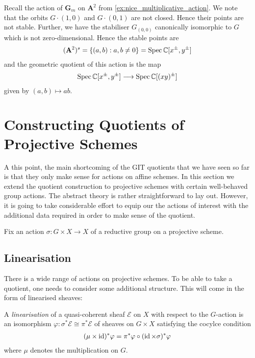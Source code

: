 \documentclass[12pt]{ociamthesis}  %
\begin{document}
\begin{example}
  Recall the action of $\mathbf G_m$ on $\mathbf A^2$ from
  \ref{ex:nice_multiplicative_action}. We note that the orbits
  $G\cdot(1,0)$ and $G\cdot(0,1)$ are not closed. Hence their points
  are not stable. Further, we have the stabiliser $G_{(0,0)}$
  canonically isomorphic to $G$ which is not zero-dimensional.
  Hence the stable points are
  \begin{align*}
    (\mathbf A^2)^s = \{(a,b):a,b\neq 0\} = \operatorname{Spec} \mathbb C[x^\pm,y^\pm]
  \end{align*}
  and the geometric quotient of this action is the map
  \begin{align*}
    \operatorname{Spec}\mathbb C[x^\pm,y^\pm]\longrightarrow\operatorname{Spec}\mathbb C[(xy)^\pm]
  \end{align*}
  given by $(a,b)\mapsto ab$.
\end{example}

\section{Constructing Quotients of Projective Schemes}

A this point, the main shortcoming of the GIT quotients that
we have seen so far is that they only make sense for actions on
affine schemes. In this section we extend the quotient construction
to projective schemes with certain well-behaved group actions.
The abstract theory is rather straightforward to lay out. However,
it is going to take considerable effort to equip our the actions of interest
with the additional data required in order to make sense of the quotient.

Fix an action $\sigma : G\times X\to X$ of a reductive
group on a projective scheme.

\subsection{Linearisation}

There is a wide range of actions on projective schemes. To be able to
take a quotient, one needs to consider some additional structure. This
will come in the form of linearised sheaves:

\begin{definition}
  A \emph{linearisation} of a quasi-coherent sheaf
  $\mathscr E$ on $X$ with respect to the $G$-action
  is an isomorphism $\varphi : \sigma^*\mathscr E \cong\pi^*\mathscr E$
  of sheaves on $G\times X$ satisfying the cocylce condition
  \begin{align}\label{eq:cocyle_condition}
    (\mu \times \operatorname{id})^*\varphi = \pi^*\varphi \circ (\operatorname{id}\times\sigma)^*\varphi
  \end{align}
  where $\mu$ denotes the multiplication on $G$.
\end{definition}
\end{document}
